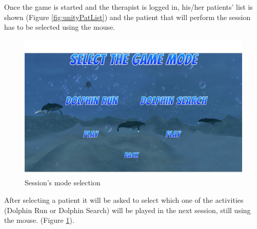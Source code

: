 Once the game is started and the therapist is logged in, his/her patients' list is shown (Figure \ref{fig:unityPatList}) and the patient that will perform the session has to be selected using the mouse.
\pagebreak
\begin{figure}[h!]
	\includegraphics[width=\textwidth]{images/UX/unity/menu/4-modeSelection}
	\caption{Session's mode selection}
	\label{fig:unityModSel}
\end{figure}

After selecting a patient it will be asked to select which one of the activities (Dolphin Run or Dolphin Search) will be played in the next session, still using the mouse. (Figure \ref{fig:unityModSel}).

